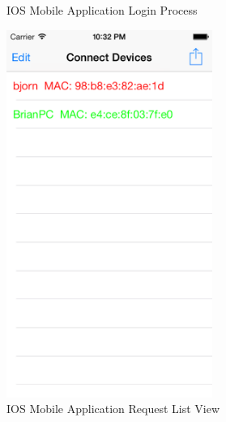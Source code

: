 \begin{figure}
\begin{minipage}{0.45\textwidth}
  		\caption{IOS Mobile Application Login Process}
  		\label{fig:ios_login_process}
  	\end{minipage}
\end{figure}

\begin{figure}
	\centering
	\begin{minipage}{0.45\textwidth}
  		\centering
  		\includegraphics[width=0.6\textwidth,natwidth=610,natheight=642]{figs/ios_app_request_list.png}
  		\caption{IOS Mobile Application Request List View}
  		\label{fig:ios_requests}
  	\end{minipage}
  	\hfill
	\begin{minipage}{0.45\textwidth}
		\centering

\end{minipage}
\end{figure}
